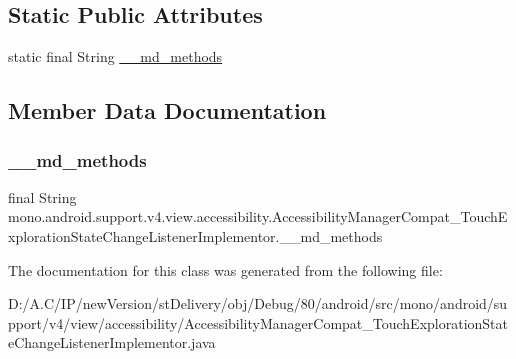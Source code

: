 \subsection*{Static Public Attributes}
\begin{DoxyCompactItemize}
\item 
static final String \hyperlink{classmono_1_1android_1_1support_1_1v4_1_1view_1_1accessibility_1_1_accessibility_manager_compat_9bd6a396809ffec70e161c1567d2a373_a7ff154717c3c87fe44c86880eea2ab12}{\+\_\+\+\_\+md\+\_\+methods}
\end{DoxyCompactItemize}


\subsection{Member Data Documentation}
\mbox{\label{classmono_1_1android_1_1support_1_1v4_1_1view_1_1accessibility_1_1_accessibility_manager_compat_9bd6a396809ffec70e161c1567d2a373_a7ff154717c3c87fe44c86880eea2ab12}} 
\subsubsection{\texorpdfstring{\+\_\+\+\_\+md\+\_\+methods}{\_\_md\_methods}}
{\footnotesize\ttfamily final String mono.\+android.\+support.\+v4.\+view.\+accessibility.\+Accessibility\+Manager\+Compat\+\_\+\+Touch\+Exploration\+State\+Change\+Listener\+Implementor.\+\_\+\+\_\+md\+\_\+methods\hspace{0.3cm}{\ttfamily [static]}}



The documentation for this class was generated from the following file\+:\begin{DoxyCompactItemize}
\item 
D\+:/\+A.\+C/\+I\+P/new\+Version/st\+Delivery/obj/\+Debug/80/android/src/mono/android/support/v4/view/accessibility/Accessibility\+Manager\+Compat\+\_\+\+Touch\+Exploration\+State\+Change\+Listener\+Implementor.\+java\end{DoxyCompactItemize}
